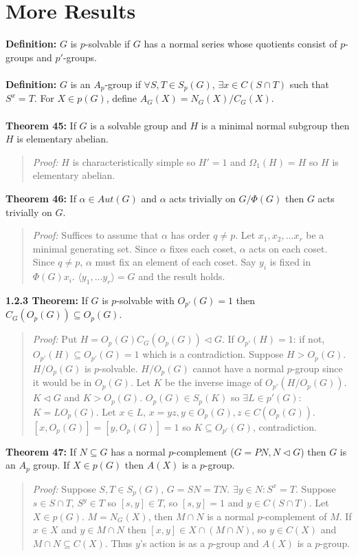 \section {More Results}
{\bf Definition:} $G$ is $p$-solvable if $G$ has a normal series whose quotients consist of $p$-groups
and $p'$-groups.
\\
\\
{\bf Definition:} $G$ is an $A_p$-group if $\forall S, T \in S_p(G)$, $\exists x \in C(S \cap T)$ such that
$S^x = T$.  For $X \in p(G)$, define $A_G(X) = N_G(X)/C_G(X)$.
\\
\\
{\bf Theorem 45:} If $G$ is a solvable group and $H$ is a minimal normal subgroup then $H$ is elementary abelian.
\begin{quote}
\emph{Proof:}
$H$ is characteristically simple so $H' = 1$ and $\Omega_1(H) = H$ so $H$ is elementary abelian.
\end{quote}
{\bf Theorem 46:} If $\alpha \in Aut(G)$ and $\alpha$ acts trivially on $G/\Phi(G)$ then $G$ acts trivially on $G$.
\begin{quote}
\emph{Proof:}
Suffices to assume that $\alpha$ has order $q \neq p$.  Let $x_1 , x_2 , \ldots x_r$ be a minimal generating set.
Since $\alpha$ fixes each coset, $\alpha$ acts on each coset.  Since $q \neq p$, $\alpha$ must fix an element
of each coset. Say $y_i$ is fixed in $\Phi(G) x_i$.  $\langle y_1, \ldots y_r \rangle = G$ and the result holds.
\end{quote}
{\bf 1.2.3 Theorem:} If $G$ is $p$-solvable with $O_{p'}(G) = 1$ then $C_G(O_p(G)) \subseteq O_p(G)$.
\begin{quote}
\emph{Proof:}
Put $H = O_p(G) C_G(O_p(G)) \lhd G$.  If $O_{p'}(H) = 1$: if not, $O_{p'}(H) \subseteq O_{p'}(G) = 1$
which is a contradiction.  Suppose $H > O_p(G)$.  $H/O_p(G)$ is $p$-solvable.  $H/O_p(G)$ cannot have
a normal $p$-group since it would be in $O_p(G)$.  Let $K$ be the inverse image of $O_{p'}(H/O_p(G))$.
$K \lhd G$ and $K > O_p(G)$.  $O_p(G) \in S_p(K)$ so $\exists L \in p'(G)$: $K = LO_p(G)$.  Let $x \in L$,
$x = yz, y \in O_p(G), z \in C(O_p(G))$.  $[x, O_p(G)] = [y, O_p(G)] =1$ so $K \subseteq O_{p'}(G)$, contradiction.
\end{quote}
{\bf Theorem 47:} If $N \subseteq G$ has a normal $p$-complement ($G = P N, N \lhd G$) then $G$ is an
$A_p$ group.  If $X \in p(G)$ then $A(X)$ is a $p$-group.
\begin{quote}
\emph{Proof:}
Suppose $S, T \in S_p(G)$, $G = SN = TN$.  $\exists y \in N: S^x = T$.  Suppose $s \in S \cap T$, $S^y \in T$
so $[s, y] \in T$,  so $[s, y] = 1$ and $y \in C(S \cap T)$.  Let $X \in p(G)$.  $M = N_G(X)$, then $M \cap N$
is a normal $p$-complement of $M$.  If $x \in X$ and $y \in M \cap N$ then $[x,y] \in X \cap (M \cap N)$, so
$y \in C(X)$ and $M \cap N \subseteq C(X)$.  Thus $y$'s action is as a $p$-group and $A(X)$ is a $p$-group.
\end{quote}

